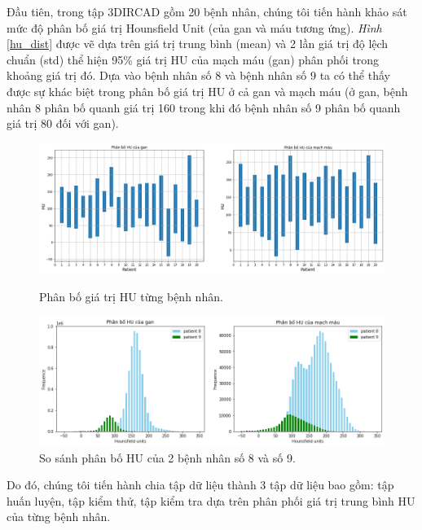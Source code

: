 Đầu tiên, trong tập 3DIRCAD gồm 20 bệnh nhân, chúng tôi tiến hành khảo sát mức độ phân bố giá trị Hounsfield Unit (của gan và máu tương ứng). \textit{Hình} \ref{hu_dist} được vẽ dựa trên giá trị trung bình (mean) và 2 lần giá trị độ lệch chuẩn (std) thể hiện 95\% giá trị HU của mạch máu (gan) phân phối trong khoảng giá trị đó. Dựa vào bệnh nhân số 8 và bệnh nhân số 9 ta có thể thấy được sự khác biệt trong phân bố giá trị HU ở cả gan và mạch máu (ở gan, bệnh nhân 8 phân bố quanh giá trị 160 trong khi đó bệnh nhân số 9 phân bố quanh giá trị 80 
đối với gan).

\begin{figure}[H]
	\begin{center}
		\includegraphics[width=13cm]{images/experiments/hu_dist.png}
		\caption{Phân bố giá trị HU từng bệnh nhân.}
		\label{hu_dist}
	\end{center}
	\begin{center}
		\includegraphics[width=13cm]{images/experiments/compare_2patient.png}
		\caption{So sánh phân bố HU của 2 bệnh nhân số 8 và số 9.}
		\label{hu_compare}
	\end{center}
\end{figure}
\vspace{-0.25cm}
Do đó, chúng tôi tiến hành chia tập dữ liệu thành 3 tập dữ liệu bao gồm: tập huấn luyện, tập kiểm thử, tập kiểm tra dựa trên phân phối giá trị trung bình HU của từng bệnh nhân.

